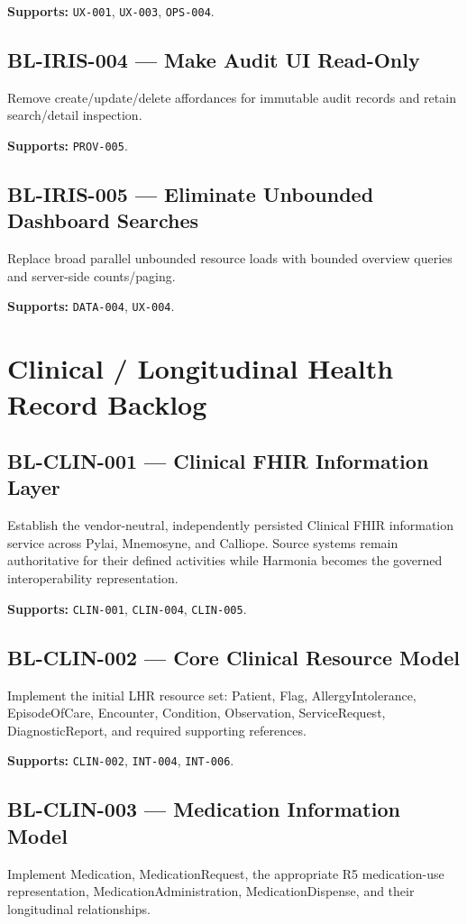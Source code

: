 \textbf{Supports:} \texttt{UX-001}, \texttt{UX-003}, \texttt{OPS-004}.

\subsection{BL-IRIS-004 --- Make Audit UI Read-Only}
Remove create/update/delete affordances for immutable audit records and retain search/detail inspection.

\textbf{Supports:} \texttt{PROV-005}.

\subsection{BL-IRIS-005 --- Eliminate Unbounded Dashboard Searches}
Replace broad parallel unbounded resource loads with bounded overview queries and server-side counts/paging.

\textbf{Supports:} \texttt{DATA-004}, \texttt{UX-004}.

\section{Clinical / Longitudinal Health Record Backlog}

\subsection{BL-CLIN-001 --- Clinical FHIR Information Layer}
Establish the vendor-neutral, independently persisted Clinical FHIR information service across Pylai, Mnemosyne, and Calliope. Source systems remain authoritative for their defined activities while Harmonia becomes the governed interoperability representation.

\textbf{Supports:} \texttt{CLIN-001}, \texttt{CLIN-004}, \texttt{CLIN-005}.

\subsection{BL-CLIN-002 --- Core Clinical Resource Model}
Implement the initial LHR resource set: Patient, Flag, AllergyIntolerance, EpisodeOfCare, Encounter, Condition, Observation, ServiceRequest, DiagnosticReport, and required supporting references.

\textbf{Supports:} \texttt{CLIN-002}, \texttt{INT-004}, \texttt{INT-006}.

\subsection{BL-CLIN-003 --- Medication Information Model}
Implement Medication, MedicationRequest, the appropriate R5 medication-use representation, MedicationAdministration, MedicationDispense, and their longitudinal relationships.

